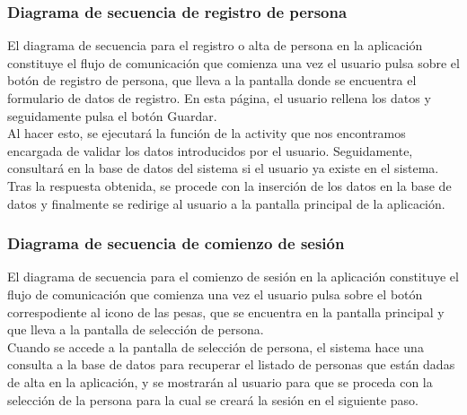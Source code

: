 \subsubsection{Diagrama de secuencia de registro de persona}

El diagrama de secuencia para el registro o alta de persona en la aplicación constituye el flujo de comunicación que comienza una vez el usuario pulsa sobre el botón de registro de persona, que lleva a la pantalla donde se encuentra el formulario de datos de registro. En esta página, el usuario rellena los datos y seguidamente pulsa el botón Guardar.\\

Al hacer esto, se ejecutará la función de la activity que nos encontramos encargada de validar los datos introducidos por el usuario. Seguidamente, consultará en la base de datos del sistema si el usuario ya existe en el sistema.\\

Tras la respuesta obtenida, se procede con la inserción de los datos en la base de datos y finalmente se redirige al usuario a la pantalla principal de la aplicación.


\subsubsection{Diagrama de secuencia de comienzo de sesión}

El diagrama de secuencia para el comienzo de sesión en la aplicación constituye el flujo de comunicación que comienza una vez el usuario pulsa sobre el botón correspodiente al icono de las pesas, que se encuentra en la pantalla principal y que lleva a la pantalla de selección de persona.\\

Cuando se accede a la pantalla de selección de persona, el sistema hace una consulta a la base de datos para recuperar el listado de personas que están dadas de alta en la aplicación, y se mostrarán al usuario para que se proceda con la selección de la persona para la cual se creará la sesión en el siguiente paso.\\


